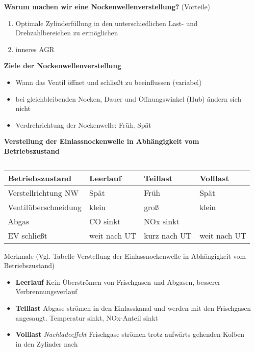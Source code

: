 \textbf{Warum machen wir eine Nockenwellenverstellung?} (Vorteile)

\begin{enumerate}
\item
  Optimale Zylinderfüllung in den unterschiedlichen Last- und
  Drehzahlbereichen zu ermöglichen
\item
  inneres AGR
\end{enumerate}

\textbf{Ziele der Nockenwellenverstellung}

\begin{itemize}
\item
  Wann das Ventil öffnet und schließt zu beeinflussen (variabel)
\item
  bei gleichbleibenden Nocken, Dauer und Öffnungswinkel (Hub) ändern
  sich nicht
\item
  Verdrehrichtung der Nockenwelle: Früh, Spät
\end{itemize}

\textbf{Verstellung der Einlassnockenwelle in Abhängigkeit vom
Betriebszustand}

\begin{table}[!ht]%
\centering 
	\caption{}%
\begin{tabular}{@{}llll@{}}
\hline
\textbf{Betriebszustand} & \textbf{Leerlauf} & \textbf{Teillast} &
\textbf{Volllast} \\
\hline
Verstellrichtung NW & Spät & Früh & Spät \\
Ventilüberschneidung & klein & groß & klein \\
Abgas & CO sinkt & NOx sinkt & \\
EV schließt & weit nach UT & kurz nach UT & weit nach UT \\
\hline
\end{tabular} 
\end{table}

Merkmale (Vgl. Tabelle Verstellung der Einlassnockenwelle in
Abhängigkeit vom Betriebszustand)

\begin{itemize}
\item
  \textbf{Leerlauf} Kein Überströmen von Frischgasen und Abgasen,
  besserer Verbrennungsverlauf
\item
  \textbf{Teillast} Abgase strömen in den Einlasskanal und werden mit
  den Frischgasen angesaugt. Temperatur sinkt, NOx-Anteil sinkt
\item
  \textbf{Volllast} \emph{Nachladeeffekt} Frischgase strömen trotz
  aufwärts gehenden Kolben in den Zylinder nach
\end{itemize}

